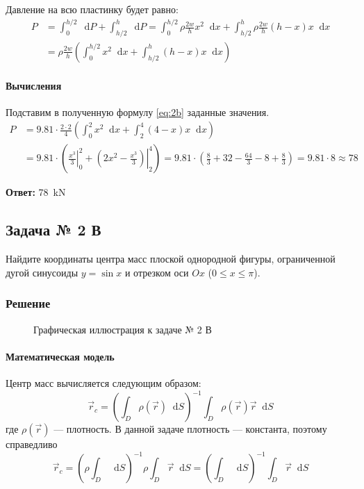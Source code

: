 \documentclass[a4paper,12pt]{article}
\newcommand*\diff{\mathop{}\!\mathrm{d}}
\begin{document}
Давление на всю пластинку будет равно:
\begin{equation}\label{eq:2b}
\begin{split}
  P &= \int_{0}^{h/2} \diff P + \int_{h/2}^{h} \diff P
    = \int_{0}^{h/2} \rho \frac{2w}{h} x^2 \diff x
     + \int_{h/2}^{h} \rho \frac{2w}{h} (h - x) x \diff x \\
    &= \rho \frac{2w}{h}
     \left(\int_{0}^{h/2} x^2 \diff x + \int_{h/2}^{h} (h - x) x \diff x\right)
\end{split}
\end{equation}

\paragraph{Вычисления}
Подставим в полученную формулу \ref{eq:2b} заданные значения.
\begin{align*}
  P &= 9.81 \cdot \frac{2 \cdot 2}{4}
    \left(\int_{0}^{2} x^2 \diff x + \int_{2}^{4} (4 - x) x \diff x\right) \\
    &= 9.81 \cdot \left(
      \left.\frac{x^3}{3}\right\rvert_{0}^{2}
      + \left.\left(2 x^2 - \frac{x^3}{3}\right)\right\rvert_{2}^{4}
    \right)
    = 9.81 \cdot
      \left(\frac{8}{3} + 32 - \frac{64}{3} - 8 + \frac{8}{3} \right)
    = 9.81 \cdot 8 \approx 78
\end{align*}

\textbf{Ответ:} \SI{78}{\kilo\newton}

\subsection{Задача № 2 В}

Найдите координаты центра масс плоской однородной фигуры,
ограниченной дугой синусоиды \(y = \sin x\)
и отрезком оси \(Ox\) (\(0 \le x \le \pi\)).

\subsubsection{Решение}

\begin{figure}[htbp]
  \centering
  \caption{Графическая иллюстрация к задаче № 2 В}\label{fig:2c}
\end{figure}

\paragraph{Математическая модель}
Центр масс вычисляется следующим образом:
\[
  \vec{r}_{c} =
    {\left(\int_{D} \rho(\vec{r}) \diff S\right)}^{-1}
    \int_{D} \rho(\vec{r}) \vec{r} \diff S
\]
где \(\rho(\vec{r})\) --- плотность.
В данной задаче плотность --- константа, поэтому справедливо
\begin{equation} \label{eq:2c-main}
  \vec{r}_{c} =
    {\left(\rho \int_{D} \diff S\right)}^{-1}
    \rho \int_{D} \vec{r} \diff S =
    {\left(\int_{D} \diff S\right)}^{-1}
    \int_{D} \vec{r} \diff S
\end{equation}
\end{document}
